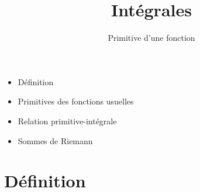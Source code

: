 









\title{{\bf Intégrales}}
\subtitle{Primitive d'une fonction}

\begin{frame}
  
  \debutmontitre

  \pause

{\footnotesize
\hfill
{}
\begin{minipage}{0.6\textwidth}
  \begin{itemize}
    \item<3-> Définition
    \item<4-> Primitives des fonctions usuelles
    \item<5-> Relation primitive-intégrale
    \item<6-> Sommes de Riemann
  \end{itemize}
\end{minipage}
}

\end{frame}

\setcounter{framenumber}{0}



\section*{Définition}


